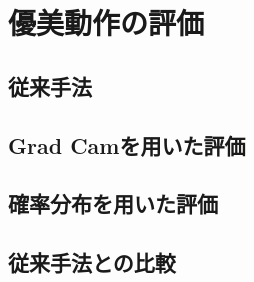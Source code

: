 \section{優美動作の評価}

\subsection{従来手法}

\subsection{Grad Camを用いた評価}

\subsection{確率分布を用いた評価}

\subsection{従来手法との比較}